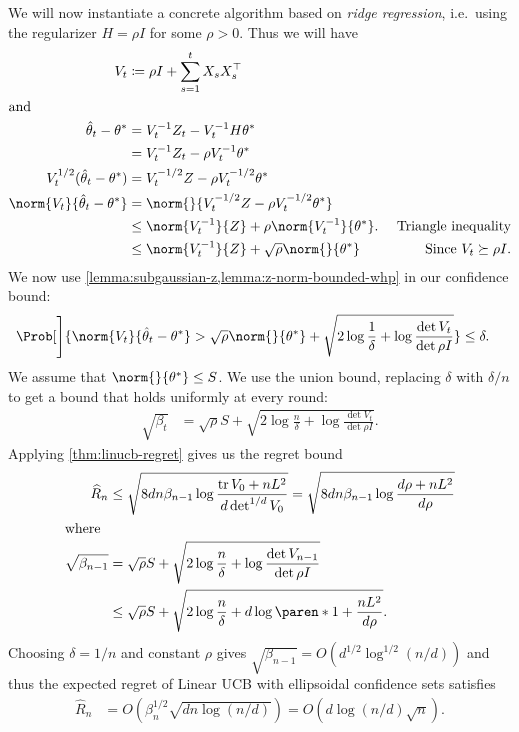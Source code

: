 \documentclass{article}
\newcommand{\defeq}{\coloneq}
\newcommand{\inv}[1]{#1^{-1}}
\DeclareMathOperator{\tr}{tr}
\DeclarePairedDelimiter{\paren}()
\newcommand{\transp}[1]{#1^\top}
\begin{document}
We will now instantiate a concrete algorithm based on \emph{ridge
  regression}, i.e.\ using the regularizer $H=\rho I$ for some
$\rho>0$.  Thus we will have
\begin{align*}
  V_t &\defeq \rho I + \sum_{s=1}^t X_s\transp{X_s}\\
  \shortintertext{and}
  \hat{\theta}_t - \theta^* &= \inv{V_t}Z_t - \inv{V_t}H\theta^* \\
                          &= \inv{V_t}Z_t - \rho\inv{V_t}\theta^* \\
  V_t^{1/2}(\hat{\theta}_t - \theta^*) &= V_t^{-1/2}Z - \rho V_t^{-1/2}\theta^* \\
  \norm{V_t}{\hat{\theta}_t - \theta^*} &= \norm{}{V_t^{-1/2}Z - \rho V_t^{-1/2}\theta^*} \\
  &\le \norm{\inv{V_t}}{Z} + \rho\norm{\inv{V_t}}{\theta^*}.\
                          &\text{Triangle inequality} \\
  &\le \norm{\inv{V_t}}{Z} + \sqrt\rho \norm{}{\theta^*} &\text{Since } V_t \succeq \rho I.
\end{align*}
We now use \cref{lemma:subgaussian-z,lemma:z-norm-bounded-whp} in our
confidence bound:
\begin{align*}
  \Prob[\Bigg]{\norm{V_t}{\hat{\theta}_t - \theta^*} > \sqrt\rho\norm{}{\theta^*} + \sqrt{2\log\frac{1}{\delta} + \log\frac{\det V_t}{\det \rho I}}}
  &\le \delta.
\end{align*}
We assume that $\norm{}{\theta^*} \le S$.  We use the union bound,
replacing $\delta$ with $\delta/n$ to get a bound that holds uniformly
at every round:
\begin{align*}
  \sqrt{\beta_t} &= \sqrt\rho S + \sqrt{2\log\frac{n}{\delta} + \log\frac{\det V_t}{\det \rho I}}.
\end{align*}
Applying \cref{thm:linucb-regret} gives us the regret bound
\begin{align*}
  \widehat{R}_n
  &\le \sqrt{8dn\beta_{n-1}\log\frac{\tr V_0 + nL^2}{d\det^{1/d} V_0}}
    = \sqrt{8dn\beta_{n-1}\log\frac{d\rho + nL^2}{d\rho}} \\
  \shortintertext{where}
  \sqrt{\beta_{n-1}}
  &= \sqrt\rho S + \sqrt{2\log\frac{n}{\delta} + \log\frac{\det V_{n-1}}{\det \rho I}} \\
  &\le \sqrt\rho S + \sqrt{2\log\frac{n}{\delta} + d\log\paren*{1 + \frac{nL^2}{d\rho}}}.
\end{align*}
Choosing $\delta=1/n$ and constant $\rho$ gives $\sqrt{\beta_{n-1}} =
O(d^{1/2}\log^{1/2}(n/d))$ and thus the expected regret of Linear UCB
with ellipsoidal confidence sets satisfies
\begin{align*}
  \widehat{R}_n &= O(\beta_n^{1/2}\sqrt{dn\log(n/d)}) = O(d\log(n/d)\sqrt{n}).
\end{align*}
\end{document}
